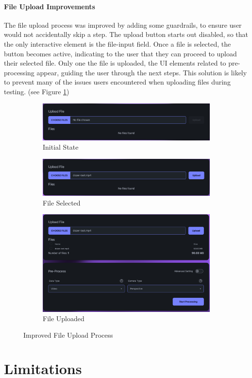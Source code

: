 \paragraph{File Upload Improvements}
The file upload process was improved by adding some guardrails, to ensure user would not accidentally skip a step. 
The upload button starts out disabled, so that the only interactive element is the file-input field.
Once a file is selected, the button becomes active, indicating to the user that they can proceed to upload their selected file.
Only one the file is uploaded, the UI elements related to pre-processing appear, guiding the user through the next steps. 
This solution is likely to prevent many of the issues users encountered when uploading files during testing. (see Figure \ref{fig:fix-4})


\begin{figure}[htb]
  \begin{subfigure}{\textwidth}
    \centering
    \includegraphics[width=.8\linewidth]{figures/fix-4.1.png}
    \caption{Initial State}
  \end{subfigure}
  \begin{subfigure}{\textwidth}
    \centering
    \includegraphics[width=.8\linewidth]{figures/fix-4.2.png}
    \caption{File Selected}
  \end{subfigure}
  \begin{subfigure}{\textwidth}
    \centering
    \includegraphics[width=.8\linewidth]{figures/fix-4.3.png}
    \caption{File Uploaded}
  \end{subfigure}
	\caption{Improved File Upload Process}
  \label{fig:fix-4}
\end{figure}

\section{Limitations}
\label{sec:discussion:limitations}
